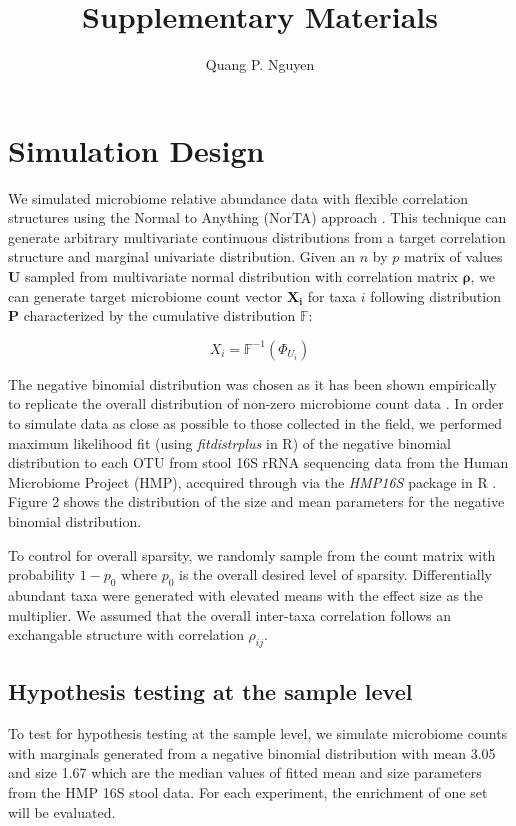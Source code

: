 \documentclass{article}
\author{Quang P. Nguyen}
\title{Supplementary Materials}
\begin{document}
\maketitle
{}

\section{Simulation Design} 

We simulated microbiome relative abundance data with flexible correlation structures using the Normal to Anything (NorTA) approach \cite{cario}. This technique can generate arbitrary multivariate continuous distributions from a target correlation structure and marginal univariate distribution. Given an $n$ by $p$ matrix of values $\mathbf{U}$ sampled from multivariate normal distribution with correlation matrix $\mathbf{\rho}$, we can generate target microbiome count vector $\mathbf{X_i}$ for taxa $i$ following distribution $\mathbf{P}$ characterized by the cumulative distribution $\mathbb{F}$:

$$X_i = \mathbb{F}^{-1}(\Phi_{U_i})$$

\noindent The negative binomial distribution was chosen as it has been shown empirically to replicate the overall distribution of non-zero microbiome count data \cite{kurtz2015}. In order to simulate data as close as possible to those collected in the field, we performed maximum likelihood fit (using \emph{fitdistrplus} in R) of the negative binomial distribution to each OTU from stool 16S rRNA sequencing data from the Human Microbiome Project (HMP), accquired through via the \emph{HMP16S} package in R \cite{schiffer2019}. Figure 2 shows the distribution of the size and mean parameters for the negative binomial distribution. 

\noindent To control for overall sparsity, we randomly sample from the count matrix with probability $1 - p_0$ where $p_0$ is the overall desired level of sparsity. Differentially abundant taxa were generated with elevated means with the effect size as the multiplier. We assumed that the overall inter-taxa correlation follows an exchangable structure with correlation $\rho_{ij}$.

\subsection{Hypothesis testing at the sample level}  
\noindent To test for hypothesis testing at the sample level, we simulate microbiome counts with marginals generated from a negative binomial distribution with mean 3.05 and size 1.67 which are the median values of fitted mean and size parameters from the HMP 16S stool data. For each experiment, the enrichment of one set will be evaluated. 
\end{document}
